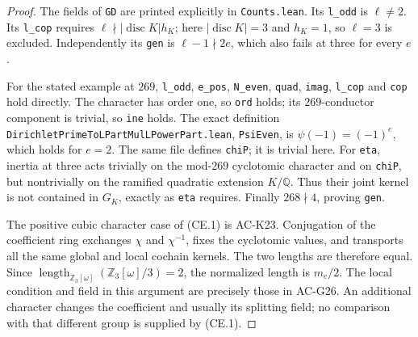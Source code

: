 \begin{proof}
The fields of \texttt{GD} are printed explicitly in
\texttt{Counts.lean}.  Its \texttt{l\_odd} is $\ell\ne2$.
Its \texttt{l\_cop} requires
$\ell\nmid |\operatorname{disc}K|h_K$; here
$|\operatorname{disc}K|=3$ and $h_K=1$, so $\ell=3$ is
excluded.  Independently its \texttt{gen} is
$\ell-1\nmid2e$, which also fails at three for every $e$.

For the stated example at $269$, \texttt{l\_odd},
\texttt{e\_pos}, \texttt{N\_even}, \texttt{quad},
\texttt{imag}, \texttt{l\_cop} and \texttt{cop} hold directly.
The character has order one, so \texttt{ord} holds; its
$269$-conductor component is trivial, so \texttt{ine} holds.
The exact definition
\texttt{DirichletPrimeToLPartMulLPowerPart.lean},
\texttt{PsiEven}, is $\psi(-1)=(-1)^e$, which holds for $e=2$.
The same file defines \texttt{chiP}; it is trivial here.
For \texttt{eta}, inertia at three acts trivially on the
mod-$269$ cyclotomic character and on \texttt{chiP}, but
nontrivially on the ramified quadratic extension
$K/\mathbb Q$.  Thus their joint kernel is not contained
in $G_K$, exactly as \texttt{eta} requires.
Finally $268\nmid4$, proving \texttt{gen}.

The positive cubic character case of (CE.1) is AC-K23.
Conjugation of the coefficient ring exchanges $\chi$ and
$\chi^{-1}$, fixes the cyclotomic values, and transports all
the same global and local cochain kernels.  The two lengths
are therefore equal.  Since
$\operatorname{length}_{\mathbb Z_3[\omega]}
 (\mathbb Z_3[\omega]/3)=2$, the normalized length is
$m_e/2$.  The local condition and field in this argument
are precisely those in AC-G26.  An additional character
changes the coefficient and usually its splitting field;
no comparison with that different group is supplied by
(CE.1).
\end{proof}

